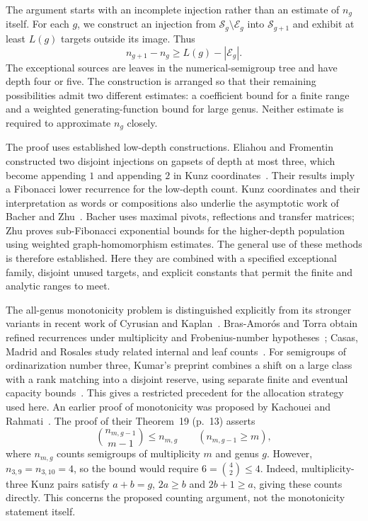 \documentclass[11pt]{amsart}
\theoremstyle{definition}
\theoremstyle{remark}
\numberwithin{equation}{section}
\begin{document}
The argument starts with an incomplete injection rather than an estimate
of $n_g$ itself. For each $g$, we construct an injection from
$\mathcal S_g\setminus\mathcal E_g$ into $\mathcal S_{g+1}$ and exhibit
at least $L(g)$ targets outside its image. Thus
\begin{equation}\label{eq:master-inequality}
 n_{g+1}-n_g\ge L(g)-|\mathcal E_g|.
\end{equation}
The exceptional sources are leaves in the numerical-semigroup tree and
have depth four or five. The construction is arranged so that their
remaining possibilities admit two different estimates: a coefficient
bound for a finite range and a weighted generating-function bound for
large genus. Neither estimate is required to approximate $n_g$ closely.

The proof uses established low-depth constructions. Eliahou and Fromentin
constructed two disjoint injections on gapsets of depth at most three,
which become appending $1$ and appending $2$ in Kunz coordinates~\cite[Propositions~5.2--5.3]{EF}.
Their results imply a Fibonacci lower recurrence for the low-depth count.
Kunz coordinates and their interpretation as words or compositions also
underlie the asymptotic work of Bacher and Zhu~\cite{Bacher,Zhu}.
Bacher uses maximal pivots, reflections and transfer matrices; Zhu proves
sub-Fibonacci exponential bounds for the higher-depth population using
weighted graph-homomorphism estimates. The general use of these methods
is therefore established. Here they are combined with a specified
exceptional family, disjoint unused targets, and explicit constants that
permit the finite and analytic ranges to meet.

The all-genus monotonicity problem is distinguished explicitly from
its stronger variants in recent work of Cyrusian and Kaplan~\cite{CK}.
Bras-Amor\'os and Torra obtain refined recurrences under multiplicity
and Frobenius-number hypotheses~\cite{BT}; Casas, Madrid and Rosales
study related internal and leaf counts~\cite{CMR}.
For semigroups of ordinarization number three, Kumar's preprint combines
a shift on a large class with a rank matching into a disjoint reserve,
using separate finite and eventual capacity bounds~\cite[Sections~7--8]{Kumar}.
This gives a restricted precedent for the allocation strategy used here.
An earlier proof of monotonicity was proposed by Kachouei and
Rahmati~\cite{KR}. The proof of their Theorem~19 (p.~13) asserts
\[
 \binom{n_{m,g-1}}{m-1}\le n_{m,g}\qquad(n_{m,g-1}\ge m),
\]
where $n_{m,g}$ counts semigroups of multiplicity $m$ and genus $g$.
However, $n_{3,9}=n_{3,10}=4$, so the bound would require
$6=\binom42\le4$.
Indeed, multiplicity-three Kunz pairs satisfy
$a+b=g$, $2a\ge b$ and $2b+1\ge a$, giving these counts directly.
This concerns the proposed counting argument, not the monotonicity
statement itself.
\end{document}
